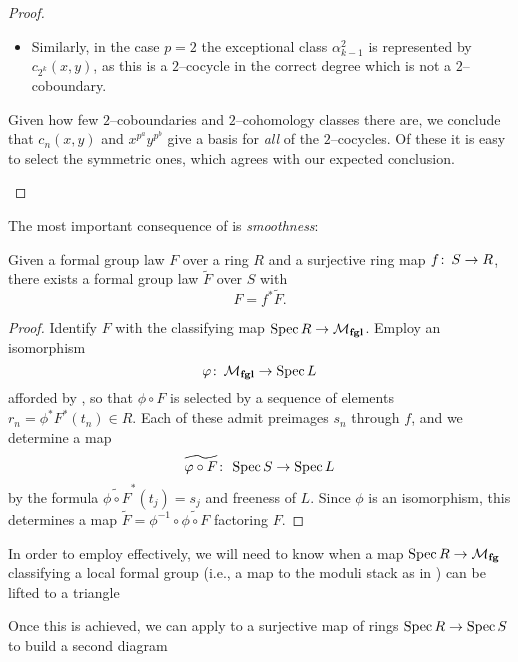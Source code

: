 \begin{proof}
\begin{description}
\begin{itemize}
\item Similarly, in the case \(p = 2\) the exceptional class \(\alpha_{k-1}^2\) is represented by \(c_{2^k}(x, y)\), as this is a \(2\)--cocycle in the correct degree which is not a \(2\)--coboundary.
\end{itemize}
Given how few \(2\)--coboundaries and \(2\)--cohomology classes there are, we conclude that \(c_n(x, y)\) and \(x^{p^a} y^{p^b}\) give a basis for \emph{all} of the \(2\)--cocycles.  Of these it is easy to select the symmetric ones, which agrees with our expected conclusion. \qedhere
\end{description}
\end{proof}

The most important consequence of  is \emph{smoothness}:
\begin{corollary}\label{MfglIsSmooth}
Given a formal group law \(F\) over a ring \(R\) and a surjective ring map \(f\colon\thinspace S \to R\), there exists a formal group law \(\widetilde F\) over \(S\) with \[F = f^* \widetilde F.\]
\end{corollary}
\begin{proof}
Identify \(F\) with the classifying map \(\operatorname{Spec} R \to \mathcal{M}_{\mathbf{fgl}}\).  Employ an isomorphism \[\varphi\colon\thinspace \mathcal{M}_{\mathbf{fgl}} \to \operatorname{Spec} L\] afforded by , so that \(\phi \circ F\) is selected by a sequence of elements \(r_n = \phi^* F^*(t_n) \in R\).  Each of these admit preimages \(s_n\) through \(f\), and we determine a map \[\widetilde{\varphi \circ F}\colon\thinspace \operatorname{Spec} S \to \operatorname{Spec} L\] by the formula \(\widetilde{\phi \circ F}^* (t_j) = s_j\) and freeness of \(L\).  Since \(\phi\) is an isomorphism, this determines a map \(\widetilde F = \phi^{-1} \circ \widetilde{\phi \circ F}\) factoring \(F\).
\end{proof}

In order to employ  effectively, we will need to know when a map \(\operatorname{Spec} R \to \mathcal{M}_{\mathbf{fg}}\) classifying a local formal group (i.e., a map to the moduli stack as in ) can be lifted to a triangle
\begin{center}
\end{center}
Once this is achieved, we can apply  to a surjective map of rings \(\operatorname{Spec} R \to \operatorname{Spec} S\) to build a second diagram
\begin{center}
\end{center}

